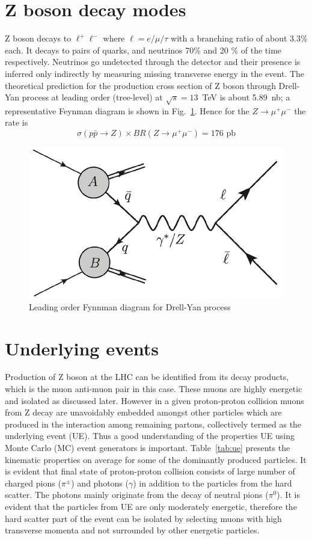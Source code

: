 \documentclass[12pt,a4paper]{article}		%
\begin{document}
\section{Z boson decay modes}
 Z boson decays to $\ell^+\ell^-$ where $\ell= e/\mu/\tau$  with a branching ratio of about 3.3\% each. It decays to pairs of quarks, and neutrinos 70\% and 20 \%  of the time respectively. Neutrinos go undetected through the detector and their presence is inferred only indirectly by measuring missing transverse energy in the event. The theoretical prediction for the production cross section of Z boson through Drell-Yan process at leading order (tree-level) at $\sqrt{s} = 13$~TeV is about 5.89~nb; a representative Feynman diagram is shown in Fig.~\ref{fig:feyn}. Hence for the $Z \to \mu^+\mu^-$ the rate is $$ \sigma( p \bar{p} \to Z) \times BR(Z \to \mu^+\mu^-) = 176  \text{ pb}$$ 
   
 \begin{figure}[h]
 		\centering	
 	\includegraphics[scale=0.5]{DrellYan.png} 
 	\caption{Leading order Fynnman diagram for Drell-Yan process}
\label{fig:feyn} 
 \end{figure}
\newpage

\section{Underlying events}

Production of Z boson at the LHC can be identified from its decay products, which is the muon anti-muon pair in this case. These muons are highly energetic and isolated as discussed later.  However in a given proton-proton collision muons from Z decay are unavoidably embedded amongst other particles which are produced in the interaction among remaining partons, collectively termed as the underlying event (UE). Thus a good understanding of the properties UE using Monte Carlo (MC) event generators is important. Table~\ref{tab:ue} presents the kinematic properties on average for some of the dominantly produced particles. It is evident that final state of proton-proton collision consists of large number of charged pions ($\pi^\pm$) and photons ($\gamma$) in addition to the particles from the hard scatter. The photons mainly originate from the decay of neutral pions ($\pi^0$). It is evident that the particles from UE are only moderately energetic, therefore the hard scatter part of the event can be isolated by selecting muons with high transverse momenta and not surrounded by other energetic particles. 
\end{document}
